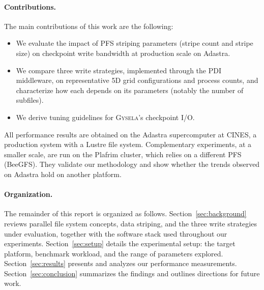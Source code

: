 \paragraph{Contributions.} The main contributions of this work are the following:
\begin{itemize}
  \item We evaluate the impact of PFS striping parameters (stripe count and stripe size) on
        checkpoint write bandwidth at production scale on Adastra.
  \item We compare three write strategies, implemented through the PDI middleware, on
        representative 5D grid configurations and process counts, and characterize how each
        depends on its parameters (notably the number of subfiles).
  \item We derive tuning guidelines for \textsc{Gysela}'s checkpoint I/O.
\end{itemize}

All performance results are obtained on the Adastra supercomputer at CINES, a production system
with a Lustre file system. Complementary experiments, at a smaller scale, are run on the
Plafrim cluster, which relies on a different PFS (BeeGFS). They validate our methodology and
show whether the trends observed on Adastra hold on another platform.

\paragraph{Organization.}
The remainder of this report is organized as follows.
Section~\ref{sec:background} reviews parallel file system concepts, data striping, and the three
write strategies under evaluation, together with the software stack used throughout our
experiments.
Section~\ref{sec:setup} details the experimental setup: the target platform, benchmark workload,
and the range of parameters explored.
Section~\ref{sec:results} presents and analyzes our performance measurements.
Section~\ref{sec:conclusion} summarizes the findings and outlines directions for future work.